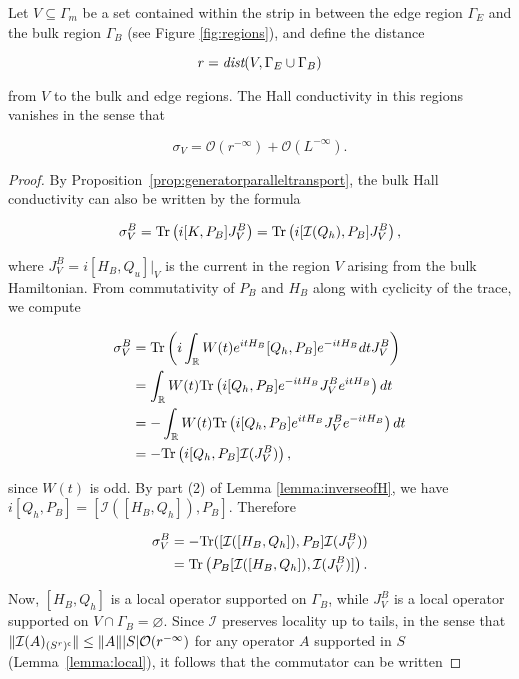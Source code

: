 \documentclass[12pt, letterpaper]{article}
\begin{document}
\begin{theorem}
Let $V \subseteq \Gamma_m$ be a set contained within the strip in between the edge region $\Gamma_E$ and the bulk region $\Gamma_B$ (see Figure \ref{fig:regions}), and define the distance

\[r = \emph{dist}(V, \Gamma_E \cup \Gamma_B)\]

from $V$ to the bulk and edge regions. The Hall conductivity in this regions vanishes in the sense that

\[\sigma_V = \mathcal{O}(r^{-\infty}) + \mathcal{O}(L^{-\infty}).\]

\end{theorem}

\begin{proof}
By Proposition~\ref{prop:generatorparalleltransport}, the bulk Hall conductivity can also be written by the formula 

\[\sigma_V^B = \text{Tr}\left(i[K,P_B]J_V^B\right) = \text{Tr}\left(i[\mathcal{I}(Q_h), P_B]J_V^B\right),\]

where $J_V^B = i[H_B, Q_u]|_V$ is the current in the region $V$ arising from the bulk Hamiltonian. From commutativity of $P_B$ and $H_B$ along with cyclicity of the trace, we compute

\[\begin{aligned}
\sigma_V^B &= \text{Tr}\left(i\int_{\mathbb{R}} W(t) e^{itH_B} [Q_h,P_B] e^{-itH_B}dt J_V^B \right)\\
&= \int_{\mathbb{R}} W(t) \text{Tr}\left(i[Q_h,P_B] e^{-itH_B}J_V^Be^{itH_B}\right)dt\\
&= -\int_{\mathbb{R}} W(t) \text{Tr}\left(i[Q_h,P_B] e^{itH_B}J_V^Be^{-itH_B}\right)dt\\
&=- \text{Tr}\left(i[Q_h,P_B]\mathcal{I}(J_V^B)\right),
\end{aligned}\]

since $W(t)$ is odd. By part (2) of Lemma \ref{lemma:inverseofH}, we have $i[Q_h,P_B] = [\mathcal{I}([H_B,Q_h]),P_B]$. Therefore

\[\begin{aligned}
\sigma_V^B &=-\text{Tr}([\mathcal{I}([H_B,Q_h]), P_B]\mathcal{I}(J_V^B))\\
&= \text{Tr}\left( P_B[\mathcal{I}([H_B,Q_h]), \mathcal{I}(J_V^B)]\right).
\end{aligned}\]

Now, $[H_B, Q_h]$ is a local operator supported on $\Gamma_B$, while $J_V^B$ is a local operator supported on $V \cap \Gamma_B = \varnothing$. Since $\mathcal{I}$ preserves locality up to tails, in the sense that $\lVert \mathcal{I}(A)_{(S^r)^\mathsf{c}} \rVert \leq \lVert A \rVert |S| \mathcal{O}(r^{-\infty})$ for any operator $A$ supported in $S$ (Lemma~\ref{lemma:local}), it follows that the commutator can be written


\end{proof}
\end{document}
